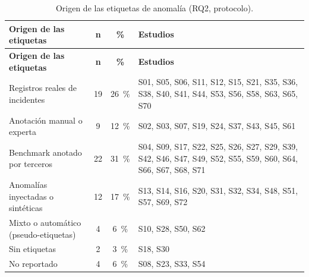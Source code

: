 \begingroup
\small
\begin{xltabular}{\linewidth}{lccX}
\caption{Origen de las etiquetas de anomal\'{i}a (RQ2, protocolo).}\label{tab:etiquetas}\\
\toprule
\textbf{Origen de las etiquetas} & \textbf{n} & \textbf{\%} & \textbf{Estudios} \\
\midrule\endfirsthead
\toprule
\textbf{Origen de las etiquetas} & \textbf{n} & \textbf{\%} & \textbf{Estudios} \\
\midrule\endhead
\bottomrule\endfoot
Registros reales de incidentes & 19 & 26~\% & S01, S05, S06, S11, S12, S15, S21, S35, S36, S38, S40, S41, S44, S53, S56, S58, S63, S65, S70 \\
Anotaci\'{o}n manual o experta & 9 & 12~\% & S02, S03, S07, S19, S24, S37, S43, S45, S61 \\
Benchmark anotado por terceros & 22 & 31~\% & S04, S09, S17, S22, S25, S26, S27, S29, S39, S42, S46, S47, S49, S52, S55, S59, S60, S64, S66, S67, S68, S71 \\
Anomal\'{i}as inyectadas o sint\'{e}ticas & 12 & 17~\% & S13, S14, S16, S20, S31, S32, S34, S48, S51, S57, S69, S72 \\
Mixto o autom\'{a}tico (pseudo-etiquetas) & 4 & 6~\% & S10, S28, S50, S62 \\
Sin etiquetas & 2 & 3~\% & S18, S30 \\
No reportado & 4 & 6~\% & S08, S23, S33, S54 \\
\end{xltabular}
\endgroup
